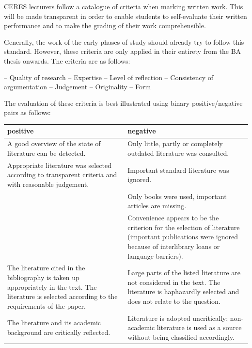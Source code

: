 \documentclass[
  english,
]{scrreprt}
\begin{document}
CERES lecturers follow a catalogue of criteria when marking written work. This will be made transparent in order to enable students to self-evaluate their written performance and to make the grading of their work comprehensible.

Generally, the work of the early phases of study should already try to follow this standard. However, these criteria are only applied in their entirety from the BA thesis onwards. The criteria are as follows:

– Quality of research – Expertise – Level of reflection – Consistency of argumentation – Judgement – Originality – Form

The evaluation of these criteria is best illustrated using binary positive/negative pairs as follows:

\begin{longtable}[]{@{}
  >{\raggedright\arraybackslash}p{}
  >{\raggedright\arraybackslash}p{}@{}}
\toprule\noalign{}
\begin{minipage}[b]{\linewidth}\raggedright
positive
\end{minipage} & \begin{minipage}[b]{\linewidth}\raggedright
negative
\end{minipage} \\
\midrule\noalign{}
\endhead
\bottomrule\noalign{}
\endlastfoot
A good overview of the state of literature can be detected. & Only little, partly or completely outdated literature was consulted. \\
Appropriate literature was selected according to transparent criteria and with reasonable judgement. & Important standard literature was ignored. \\
& Only books were used, important articles are missing. \\
& Convenience appears to be the criterion for the selection of literature (important publications were ignored because of interlibrary loans or language barriers). \\
The literature cited in the bibliography is taken up appropriately in the text. The literature is selected according to the requirements of the paper. & Large parts of the listed literature are not considered in the text. The literature is haphazardly selected and does not relate to the question. \\
The literature and its academic background are critically reflected. & Literature is adopted uncritically; non-academic literature is used as a source without being classified accordingly. \\

\end{longtable}
\end{document}
